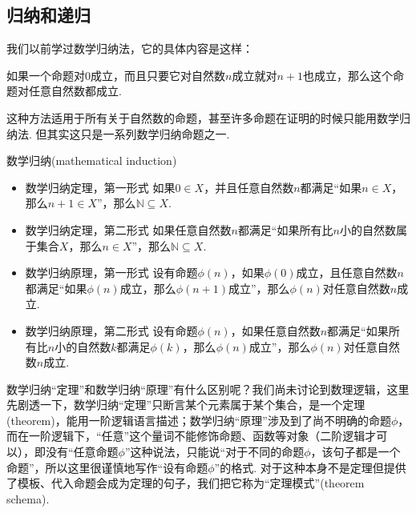 \subsection{归纳和递归}

我们以前学过数学归纳法，它的具体内容是这样：
\begin{reference}
    如果一个命题对\(0\)成立，而且只要它对自然数\(n\)成立就对\(n+1\)也成立，那么这个命题对任意自然数都成立.
\end{reference}
这种方法适用于所有关于自然数的命题，甚至许多命题在证明的时候只能用数学归纳法. 但其实这只是一系列数学归纳命题之一.

\begin{theorem}{数学归纳(mathematical induction)}
    \begin{itemize}
        \item 数学归纳定理，第一形式 \newline
        如果\(0 \in X\)，并且任意自然数\(n\)都满足“如果\(n \in X\)，那么\(n+1 \in X\)”，那么\(\mathbb{N} \subseteq X\).
        \item 数学归纳定理，第二形式 \newline
        如果任意自然数\(n\)都满足“如果所有比\(n\)小的自然数属于集合\(X\)，那么\(n \in X\)”，那么\(\mathbb{N} \subseteq X\).
        \item 数学归纳原理，第一形式 \newline
        设有命题\(\phi(n)\)，如果\(\phi(0)\)成立，且任意自然数\(n\)都满足“如果\(\phi(n)\)成立，那么\(\phi(n+1)\)成立”，那么\(\phi(n)\)对任意自然数\(n\)成立.
        \item 数学归纳原理，第二形式 \newline
        设有命题\(\phi(n)\)，如果任意自然数\(n\)都满足“如果所有比\(n\)小的自然数\(k\)都满足\(\phi(k)\)，那么\(\phi(n)\)成立”，那么\(\phi(n)\)对任意自然数\(n\)成立.
    \end{itemize}
\end{theorem}

数学归纳“定理”和数学归纳“原理”有什么区别呢？我们尚未讨论到数理逻辑，这里先剧透一下，数学归纳“定理”只断言某个元素属于某个集合，是一个定理(theorem)，能用一阶逻辑语言描述；数学归纳“原理”涉及到了尚不明确的命题\(\phi\)，而在一阶逻辑下，“任意”这个量词不能修饰命题、函数等对象（二阶逻辑才可以），即没有“任意命题\(\phi\)”这种说法，只能说“对于不同的命题\(\phi\)，该句子都是一个命题”，所以这里很谨慎地写作“设有命题\(\phi\)”的格式. 对于这种本身不是定理但提供了模板、代入命题会成为定理的句子，我们把它称为“定理模式”(theorem schema).

